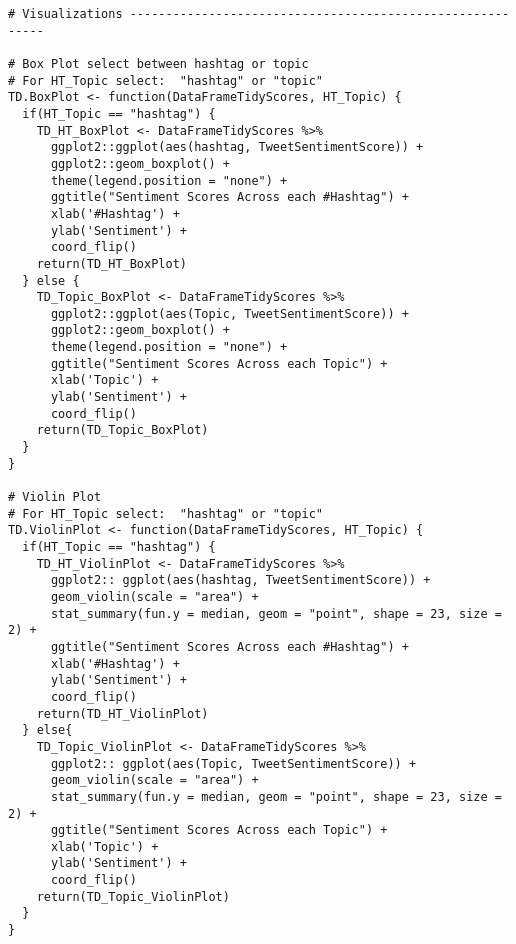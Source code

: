 \begin{lstlisting}
# Visualizations ----------------------------------------------------------

# Box Plot select between hashtag or topic
# For HT_Topic select:  "hashtag" or "topic"
TD.BoxPlot <- function(DataFrameTidyScores, HT_Topic) {
  if(HT_Topic == "hashtag") {
    TD_HT_BoxPlot <- DataFrameTidyScores %>% 
      ggplot2::ggplot(aes(hashtag, TweetSentimentScore)) +
      ggplot2::geom_boxplot() +
      theme(legend.position = "none") +
      ggtitle("Sentiment Scores Across each #Hashtag") +
      xlab('#Hashtag') +
      ylab('Sentiment') +
      coord_flip()
    return(TD_HT_BoxPlot)
  } else {
    TD_Topic_BoxPlot <- DataFrameTidyScores %>% 
      ggplot2::ggplot(aes(Topic, TweetSentimentScore)) +
      ggplot2::geom_boxplot() +
      theme(legend.position = "none") +
      ggtitle("Sentiment Scores Across each Topic") +
      xlab('Topic') +
      ylab('Sentiment') +
      coord_flip()
    return(TD_Topic_BoxPlot)
  }
}

# Violin Plot
# For HT_Topic select:  "hashtag" or "topic"
TD.ViolinPlot <- function(DataFrameTidyScores, HT_Topic) {
  if(HT_Topic == "hashtag") {
    TD_HT_ViolinPlot <- DataFrameTidyScores %>% 
      ggplot2:: ggplot(aes(hashtag, TweetSentimentScore)) +
      geom_violin(scale = "area") +
      stat_summary(fun.y = median, geom = "point", shape = 23, size = 2) +
      ggtitle("Sentiment Scores Across each #Hashtag") +
      xlab('#Hashtag') +
      ylab('Sentiment') +
      coord_flip()
    return(TD_HT_ViolinPlot)
  } else{
    TD_Topic_ViolinPlot <- DataFrameTidyScores %>% 
      ggplot2:: ggplot(aes(Topic, TweetSentimentScore)) +
      geom_violin(scale = "area") +
      stat_summary(fun.y = median, geom = "point", shape = 23, size = 2) +
      ggtitle("Sentiment Scores Across each Topic") +
      xlab('Topic') +
      ylab('Sentiment') +
      coord_flip()
    return(TD_Topic_ViolinPlot)
  }
}


\end{lstlisting}

